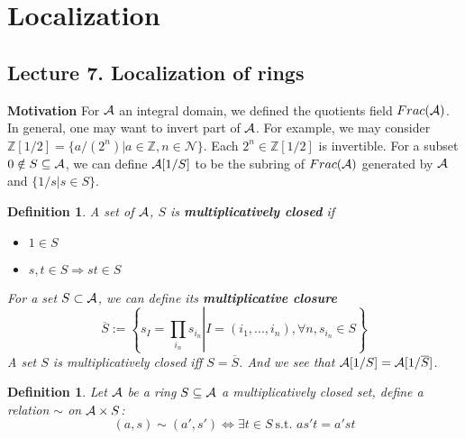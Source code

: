 \documentclass[11pt]{article}
\newtheorem{dfn}[thm]{Definition}
\newcommand{\intg}{\mathbb Z}
\newcommand{\cala}{{\cal A}}
\newcommand{\Lrta}{\Longrightarrow}
\begin{document}
\section{Localization}

\subsection{Lecture 7. Localization of rings}
\textbf{Motivation}
For $\cala$ an integral domain, we defined the quotients field $Frac(\cala)$. In general, one may want to invert part of $\cala$. For example, we may consider $\intg[1/2]=\{a/(2^n)|a\in \intg, n\in \mathcal{N}\}$. Each $2^n\in \intg[1/2]$ is invertible. For a subset $0\notin S\subseteq \cala$, we can define $\cala[1/S]$ to be the subring of $Frac(\cala)$ generated by $\cala$ and $\{1/s|s\in S\}$.

\begin{dfn}
A set of $\cala$, $S$ is \textbf{multiplicatively closed} if 
\begin{itemize}
\item $1\in S$
\item $s,t\in S\Lrta st\in S$
\end{itemize}
For a set $S\subset \cala$, we can define its \textbf{multiplicative closure}
$$
\overline{S}:=\left\{s_{I}=\left. \prod_{i_n} s_{i_n}\right| I=(i_1,...,i_n), \forall{n},  s_{i_n}\in S\right\}
$$
A set $S$ is multiplicatively closed iff $S=\overline{S}$. And we see that $\cala[1/S]=\cala[1/\overline{S}]$.
\end{dfn}


\begin{dfn}
Let $\cala$ be a ring $S\subseteq \cala$ a multiplicatively closed set, define a relation $\sim $ on $\cala\times S$:
$$
(a,s)\sim(a',s')\Longleftrightarrow\exists t\in S \ \text{s.t. } as' t= a' st
$$
\end{dfn}
\end{document}
